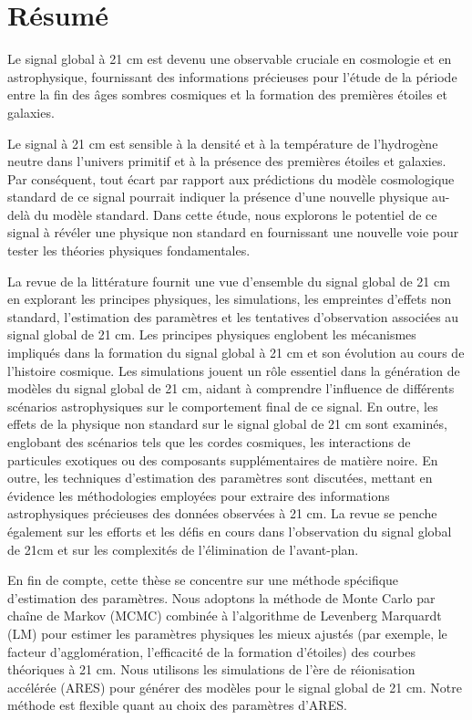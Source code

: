 \documentclass[12pt, TexShade, letterpaper]{report}
\begin{document}
\chapter*{Résumé}
	\label{chap:frAbstract}
Le signal global à 21 cm est devenu une observable cruciale en cosmologie et en astrophysique, fournissant des informations précieuses pour l'étude de la période entre la fin des âges sombres cosmiques et la formation des premières étoiles et galaxies.\par

Le signal à 21 cm est sensible à la densité et à la température de l'hydrogène neutre dans l'univers primitif et à la présence des premières étoiles et galaxies. Par conséquent, tout écart par rapport aux prédictions du modèle cosmologique standard de ce signal pourrait indiquer la présence d'une nouvelle physique au-delà du modèle standard. Dans cette étude, nous explorons le potentiel de ce signal à révéler une physique non standard en fournissant une nouvelle voie pour tester les théories physiques fondamentales. \par

La revue de la littérature fournit une vue d'ensemble du signal global de 21 cm en explorant les principes physiques, les simulations, les empreintes d'effets non standard, l'estimation des paramètres et les tentatives d'observation associées au signal global de 21 cm. Les principes physiques englobent les mécanismes impliqués dans la formation du signal global à 21 cm et son évolution au cours de l'histoire cosmique. Les simulations jouent un rôle essentiel dans la génération de modèles du signal global de 21 cm, aidant à comprendre l'influence de différents scénarios astrophysiques sur le comportement final de ce signal. En outre, les effets de la physique non standard sur le signal global de 21 cm sont examinés, englobant des scénarios tels que les cordes cosmiques, les interactions de particules exotiques ou des composants supplémentaires de matière noire. En outre, les techniques d'estimation des paramètres sont discutées, mettant en évidence les méthodologies employées pour extraire des informations astrophysiques précieuses des données observées à 21 cm. La revue se penche également sur les efforts et les défis en cours dans l'observation du signal global de 21cm et sur les complexités de l'élimination de l'avant-plan.\par

En fin de compte, cette thèse se concentre sur une méthode spécifique d'estimation des paramètres. Nous adoptons la méthode de Monte Carlo par chaîne de Markov (MCMC) combinée à l'algorithme de Levenberg Marquardt (LM) pour estimer les paramètres physiques les mieux ajustés (par exemple, le facteur d'agglomération, l'efficacité de la formation d'étoiles) des courbes théoriques à 21 cm. Nous utilisons les simulations de l'ère de réionisation accélérée (ARES) pour générer des modèles pour le signal global de 21 cm. Notre méthode est flexible quant au choix des paramètres d'ARES.\par
\end{document}
